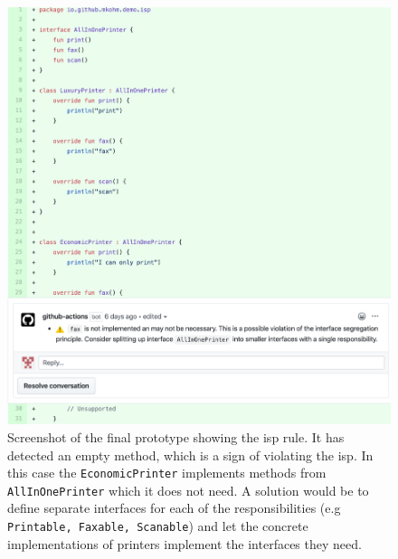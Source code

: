 \begin{figure}[h!]
    \centering
    \includegraphics[width=\textwidth]{images/final_isp.png}
    \caption{Screenshot of the final prototype showing the \gls{isp} rule. It has detected an empty method, which is a sign of violating the \gls{isp}. In this case the \texttt{EconomicPrinter} implements methods from \texttt{AllInOnePrinter} which it does not need. A solution would be to define separate interfaces for each of the responsibilities (e.g \texttt{Printable, Faxable, Scanable}) and let the concrete implementations of printers implement the interfaces they need.}
\end{figure}
